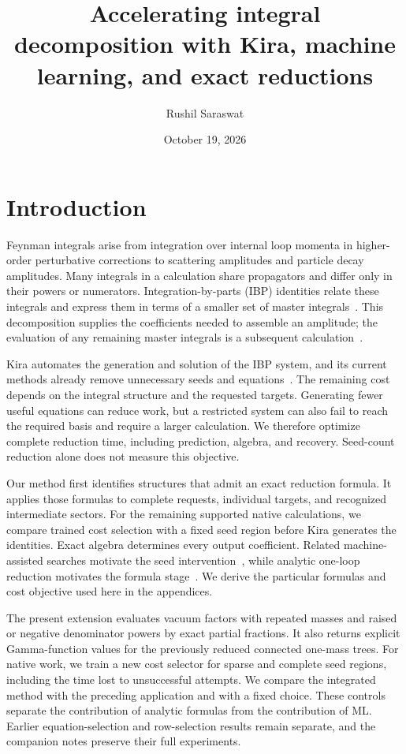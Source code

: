 \documentclass[11pt,a4paper]{article}
\title{Accelerating integral decomposition with Kira, machine learning, and exact reductions}
\author{Rushil Saraswat}
\date{October 19, 2026}
\begin{document}
\maketitle


\section{Introduction}
Feynman integrals arise from integration over internal loop momenta in higher-order perturbative corrections to scattering amplitudes and particle decay amplitudes. Many integrals in a calculation share propagators and differ only in their powers or numerators. Integration-by-parts (IBP) identities relate these integrals and express them in terms of a smaller set of master integrals~\cite{Weinzierl2022,ChetyrkinTkachov}. This decomposition supplies the coefficients needed to assemble an amplitude; the evaluation of any remaining master integrals is a subsequent calculation~\cite{Weinzierl2022}.

Kira automates the generation and solution of the IBP system, and its current methods already remove unnecessary seeds and equations~\cite{KiraOriginal,Kira3}. The remaining cost depends on the integral structure and the requested targets. Generating fewer useful equations can reduce work, but a restricted system can also fail to reach the required basis and require a larger calculation. We therefore optimize complete reduction time, including prediction, algebra, and recovery. Seed-count reduction alone does not measure this objective.

Our method first identifies structures that admit an exact reduction formula. It applies those formulas to complete requests, individual targets, and recognized intermediate sectors. For the remaining supported native calculations, we compare trained cost selection with a fixed seed region before Kira generates the identities. Exact algebra determines every output coefficient. Related machine-assisted searches motivate the seed intervention~\cite{Song2025,TubeSeeding2026}, while analytic one-loop reduction motivates the formula stage~\cite{DennerDittmaier2006,Hu2025}. We derive the particular formulas and cost objective used here in the appendices.

The present extension evaluates vacuum factors with repeated masses and raised or negative denominator powers by exact partial fractions. It also returns explicit Gamma-function values for the previously reduced connected one-mass trees. For native work, we train a new cost selector for sparse and complete seed regions, including the time lost to unsuccessful attempts. We compare the integrated method with the preceding application and with a fixed choice. These controls separate the contribution of analytic formulas from the contribution of ML. Earlier equation-selection and row-selection results remain separate, and the companion notes preserve their full experiments.
\end{document}

